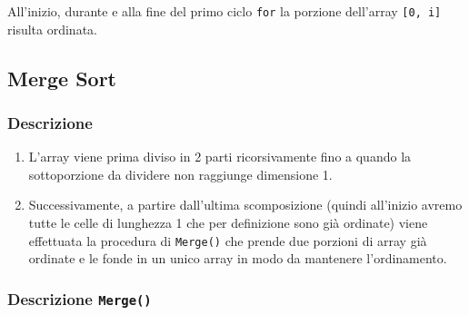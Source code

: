 \documentclass{article}
\begin{document}
All'inizio, durante e alla fine del primo ciclo \verb|for| la porzione dell'array \verb|[0, i]| risulta ordinata.



\subsection{Merge Sort}

\subsubsection{Descrizione}

\begin{enumerate}
    \item L'array viene prima diviso in 2 parti ricorsivamente fino a quando la sottoporzione da dividere non raggiunge dimensione 1.
    \item Successivamente, a partire dall'ultima scomposizione (quindi all'inizio avremo tutte le celle di lunghezza 1 che per definizione sono già ordinate) viene effettuata la procedura di \verb|Merge()| che prende due porzioni di array già ordinate e le fonde in un unico array in modo da mantenere l'ordinamento.
\end{enumerate}

\cprotect\subsubsection{Descrizione \verb|Merge()|}
\end{document}

